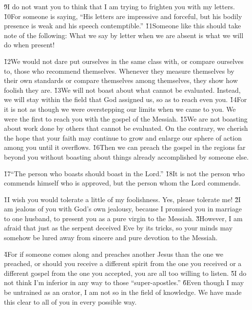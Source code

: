 \v{9}I do not want you to think that I am trying to frighten you with my letters. \v{10}For someone is saying, ``His letters are impressive and forceful, but his bodily presence is weak and his speech contemptible.'' \v{11}Someone like this should take note of the following: What we say by letter when we are absent is what we will do when present!

\v{12}We would not dare put ourselves in the same class with, or compare ourselves to, those who recommend themselves. Whenever they measure themselves by their own standards or compare themselves among themselves, they show how foolish they are. \v{13}We will not boast about what cannot be evaluated. Instead, we will stay within the field that God assigned us, so as to reach even you. \v{14}For it is not as though we were overstepping our limits when we came to you. We were the first to reach you with the gospel of the Messiah. \v{15}We are not boasting about work done by others that cannot be evaluated. On the contrary, we cherish the hope that your faith may continue to grow and enlarge our sphere of action among you until it overflows. \v{16}Then we can preach the gospel in the regions far beyond you without boasting about things already accomplished by someone else.

\v{17}``The person who boasts should boast in the Lord.'' \v{18}It is not the person who commends himself who is approved, but the person whom the Lord commends.

\v{1}I wish you would tolerate a little of my foolishness. Yes, please tolerate me! \v{2}I am jealous of you with God's own jealousy, because I promised you in marriage to one husband, to present you as a pure virgin to the Messiah. \v{3}However, I am afraid that just as the serpent deceived Eve by its tricks, so your minds may somehow be lured away from sincere and pure devotion to the Messiah.

\v{4}For if someone comes along and preaches another Jesus than the one we preached, or should you receive a different spirit from the one you received or a different gospel from the one you accepted, you are all too willing to listen. \v{5}I do not think I'm inferior in any way to those ``super-apostles.'' \v{6}Even though I may be untrained as an orator, I am not so in the field of knowledge. We have made this clear to all of you in every possible way.

